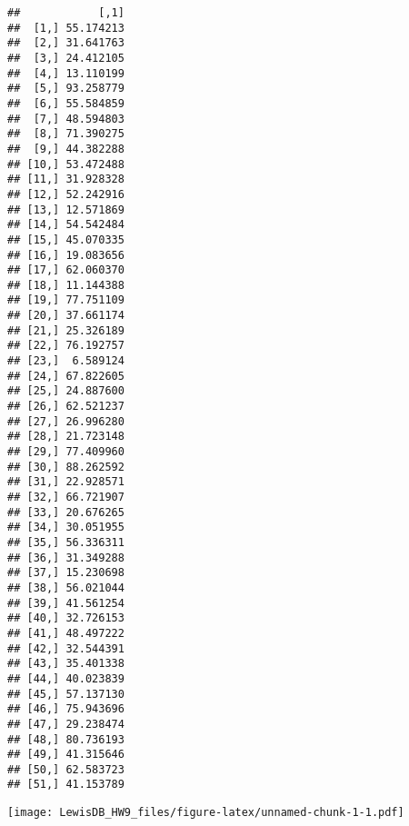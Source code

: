 \documentclass[]{article}
\newenvironment{Shaded}{\begin{snugshade}}{\end{snugshade}}
\newcommand{\KeywordTok}[1]{\textcolor[rgb]{0.13,0.29,0.53}{\textbf{#1}}}
\newcommand{\DataTypeTok}[1]{\textcolor[rgb]{0.13,0.29,0.53}{#1}}
\newcommand{\DecValTok}[1]{\textcolor[rgb]{0.00,0.00,0.81}{#1}}
\newcommand{\StringTok}[1]{\textcolor[rgb]{0.31,0.60,0.02}{#1}}
\newcommand{\ControlFlowTok}[1]{\textcolor[rgb]{0.13,0.29,0.53}{\textbf{#1}}}
\newcommand{\OperatorTok}[1]{\textcolor[rgb]{0.81,0.36,0.00}{\textbf{#1}}}
\newcommand{\NormalTok}[1]{#1}
\begin{document}
\begin{verbatim}
##            [,1]
##  [1,] 55.174213
##  [2,] 31.641763
##  [3,] 24.412105
##  [4,] 13.110199
##  [5,] 93.258779
##  [6,] 55.584859
##  [7,] 48.594803
##  [8,] 71.390275
##  [9,] 44.382288
## [10,] 53.472488
## [11,] 31.928328
## [12,] 52.242916
## [13,] 12.571869
## [14,] 54.542484
## [15,] 45.070335
## [16,] 19.083656
## [17,] 62.060370
## [18,] 11.144388
## [19,] 77.751109
## [20,] 37.661174
## [21,] 25.326189
## [22,] 76.192757
## [23,]  6.589124
## [24,] 67.822605
## [25,] 24.887600
## [26,] 62.521237
## [27,] 26.996280
## [28,] 21.723148
## [29,] 77.409960
## [30,] 88.262592
## [31,] 22.928571
## [32,] 66.721907
## [33,] 20.676265
## [34,] 30.051955
## [35,] 56.336311
## [36,] 31.349288
## [37,] 15.230698
## [38,] 56.021044
## [39,] 41.561254
## [40,] 32.726153
## [41,] 48.497222
## [42,] 32.544391
## [43,] 35.401338
## [44,] 40.023839
## [45,] 57.137130
## [46,] 75.943696
## [47,] 29.238474
## [48,] 80.736193
## [49,] 41.315646
## [50,] 62.583723
## [51,] 41.153789
\end{verbatim}

\begin{Shaded}
\end{Shaded}

\texttt{[image: LewisDB\_HW9\_files/figure-latex/unnamed-chunk-1-1.pdf]}

\begin{Shaded}
\end{Shaded}
\end{document}
